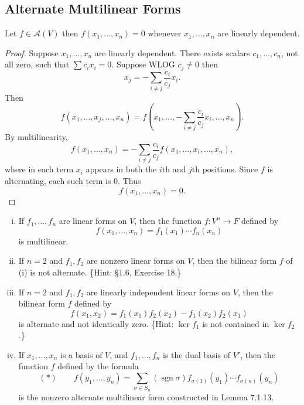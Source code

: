 \subsection{Alternate Multilinear Forms}

\begin{tcolorbox}[title=Problem 1, breakable]
    Let $f \in \mathcal{A}(V)$ then $f(x_1, \ldots, x_n) = 0$
    whenever $x_1, \ldots, x_n$ are linearly dependent.
\end{tcolorbox}

\begin{proof}
    Suppose $x_1, \ldots, x_n$ are linearly dependent.
    There exists scalars $c_1, \ldots, c_n$, not all zero, such that 
    $\sum c_i x_i = 0$. Suppose WLOG $c_j \ne 0$ then 
    \[x_j = -\sum_{i \ne j} \frac{c_i}{c_j} x_i.\]
    Then 
    \[
    f(x_1, \ldots, x_j, \ldots, x_n)
    =
    f\left(x_1, \ldots, -\sum_{i \ne j} \frac{c_i}{c_j} x_i, \ldots, x_n\right).
    \]
    By multilinearity,
    \[
    f(x_1, \ldots, x_n)
    =
    -\sum_{i \ne j} \frac{c_i}{c_j}
    f(x_1, \ldots, x_i, \ldots, x_n),
    \]
    where in each term $x_i$ appears in both the $i$th and $j$th positions.
    Since $f$ is alternating, each such term is $0$. Thus
    \[
    f(x_1, \ldots, x_n)=0.
    \]
\end{proof}


\begin{tcolorbox}[title=Problem 2, breakable]
\begin{enumerate}[(i)]
    \item If $f_1, \ldots, f_n$ are linear forms on $V$, then the function $f: V^n \to F$ defined by
    \[
        f(x_1, \ldots, x_n) = f_1(x_1) \cdots f_n(x_n)
    \]
    is multilinear.

    \item If $n = 2$ and $f_1, f_2$ are nonzero linear forms on $V$, then the bilinear form $f$ of (i) is not alternate. 
    \{Hint: \S1.6, Exercise 18.\}

    \item If $n = 2$ and $f_1, f_2$ are linearly independent linear forms on $V$, then the bilinear form $f$ defined by
    \[
        f(x_1, x_2) = f_1(x_1)f_2(x_2) - f_1(x_2)f_2(x_1)
    \]
    is alternate and not identically zero. \{Hint: $\ker f_1$ is not contained in $\ker f_2$.\}

    \item If $x_1, \ldots, x_n$ is a basis of $V$, and $f_1, \ldots, f_n$ is the dual basis of $V'$, then the function $f$ defined by the formula
    \[
        (*) \qquad f(y_1, \ldots, y_n) = \sum_{\sigma \in S_n} (\operatorname{sgn} \sigma) f_{\sigma(1)}(y_1) \cdots f_{\sigma(n)}(y_n)
    \]
    is the nonzero alternate multilinear form constructed in Lemma 7.1.13.
\end{enumerate}
\end{tcolorbox}

